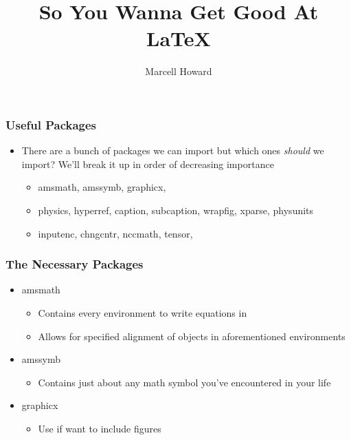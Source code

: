 \documentclass[fleqn, 11pt]{beamer}
\title{So You Wanna Get Good At \LaTeX}
\author{Marcell Howard}
\begin{document}
\begin{frame}
	\titlepage
\end{frame}

\begin{frame}
	\frametitle{Useful Packages}
	
	\begin{itemize}
		\item<1->There are a bunch of packages we can import but which ones \emph{should} we import? We'll break it up in order of decreasing importance
		\begin{itemize}
			\item<2-> amsmath, amssymb, graphicx,
			\item<3-> physics, hyperref, caption, subcaption, wrapfig, xparse, physunits
			\item<4-> inputenc, chngcntr, nccmath, tensor,
		\end{itemize}
	\end{itemize}
\end{frame}

\begin{frame}
	\frametitle{The Necessary Packages}
	
	\begin{itemize}
		\item<1-> amsmath
		\begin{itemize}
			\item<2-> Contains every environment to write equations in
			\item<2-> Allows for specified alignment of objects in aforementioned environments
		\end{itemize}
		\item<1-> amssymb
		\begin{itemize}
			\item<3-> Contains just about any math symbol you've encountered in your life
		\end{itemize}
		\item<1-> graphicx
		\begin{itemize}
			\item<4-> Use if want to include figures
		\end{itemize}
	\end{itemize}
\end{frame}
\end{document}
